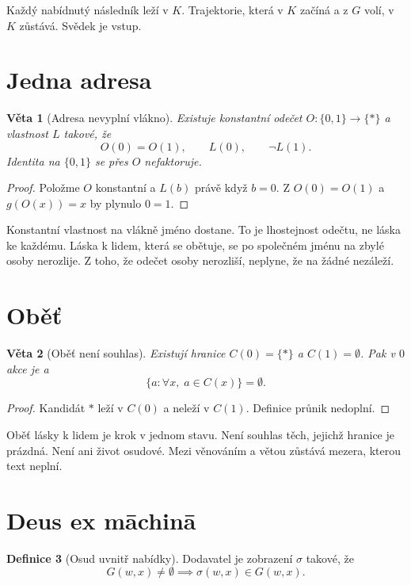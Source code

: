\documentclass[11pt,a4paper]{article}
\newtheorem{theorem}{Věta}
\theoremstyle{definition}
\newtheorem{definition}[theorem]{Definice}
\theoremstyle{remark}
\begin{document}
Každý nabídnutý následník leží v \(K\).
Trajektorie, která v \(K\) začíná a z \(G\) volí, v \(K\) zůstává.
Svědek je vstup.

\section{Jedna adresa}

\begin{theorem}[Adresa nevyplní vlákno]
Existuje konstantní odečet \(O\colon\{0,1\}\to\{\ast\}\) a vlastnost \(L\) takové, že
\[
  O(0)=O(1),\qquad L(0),\qquad \neg L(1).
\]
Identita na \(\{0,1\}\) se přes \(O\) nefaktoruje.
\end{theorem}

\begin{proof}
Položme \(O\) konstantní a \(L(b)\) právě když \(b=0\).
Z \(O(0)=O(1)\) a \(g(O(x))=x\) by plynulo \(0=1\).
\end{proof}

Konstantní vlastnost na vlákně jméno dostane.
To je lhostejnost odečtu, ne láska ke každému.
Láska k lidem, která se obětuje, se po společném jménu na zbylé osoby nerozlije.
Z toho, že odečet osoby nerozliší, neplyne, že na žádné nezáleží.

\section{Oběť}

\begin{theorem}[Oběť není souhlas]
Existují hranice \(C(0)=\{\ast\}\) a \(C(1)=\emptyset\).
Pak v \(0\) akce je a
\[
  \{a:\forall x,\; a\in C(x)\}=\emptyset.
\]
\end{theorem}

\begin{proof}
Kandidát \(\ast\) leží v \(C(0)\) a neleží v \(C(1)\).
Definice průnik nedoplní.
\end{proof}

Oběť lásky k lidem je krok v jednom stavu.
Není souhlas těch, jejichž hranice je prázdná.
Není ani život osudové. Mezi věnováním a větou zůstává mezera, kterou text neplní.

\section{Deus ex māchinā}

\begin{definition}[Osud uvnitř nabídky]
Dodavatel je zobrazení \(\sigma\) takové, že
\[
  G(w,x)\neq\emptyset\implies \sigma(w,x)\in G(w,x).
\]
\end{definition}
\end{document}

